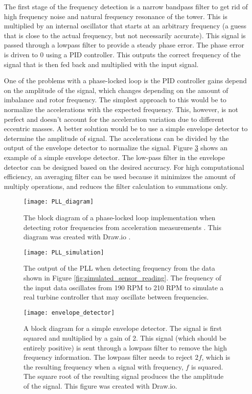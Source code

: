 The first stage of the frequency detection is a narrow bandpass filter to get rid of high frequency noise and natural frequency resonance of the tower.  This is multiplied by an internal oscillator that starts at an arbitrary frequency (a guess that is close to the actual frequency, but not necessarily accurate).  This signal is passed through a lowpass filter to provide a steady phase error.  The phase error is driven to 0 using a PID controller.  This outputs the correct frequency of the signal that is then fed back and multiplied with the input signal.

One of the problems with a phase-locked loop is the PID controller gains depend on the amplitude of the signal, which changes depending on the amount of imbalance and rotor frequency.  The simplest approach to this would be to normalize the accelerations with the expected frequency.  This, however, is not perfect and doesn't account for the acceleration variation due to different eccentric masses.  A better solution would be to use a simple envelope detector to determine the amplitude of signal.  The accelerations can be divided by the output of the envelope detector to normalize the signal.  Figure \ref{fig:envelope_detector} shows an example of a simple envelope detector\cite{envelope_detector_ref}.  The low-pass filter in the envelope detector can be designed based on the desired accuracy.  For high computational efficiency, an averaging filter can be used because it minimizes the amount of multiply operations, and reduces the filter calculation to summations only.

\begin{figure}
	\centering
	\texttt{[image: PLL\_diagram]}
	\decoRule
	\caption{The block diagram of a phase-locked loop implementation when detecting rotor frequencies from acceleration measurements \cite{embedded_zoom_fft}.  This diagram was created with Draw.io \cite{draw_io}.}
	\label{fig:PLL_diagram}
\end{figure}

\begin{figure}
	\centering
	\texttt{[image: PLL\_simulation]}
	\decoRule
	\caption{The output of the PLL  when detecting frequency from the data shown in Figure \ref{fig:simulated_sensor_reading}.  The frequency of the input data oscillates from 190 RPM to 210 RPM to simulate a real turbine controller that may oscillate between frequencies.}
	\label{fig:PLL_simulation}
\end{figure}

\begin{figure}
	\centering
	\texttt{[image: envelope\_detector]}
	\decoRule
	\caption{A block diagram for a simple envelope detector.  The signal is first squared and multiplied by a gain of 2.  This signal (which should be entirely positive) is sent through a lowpass filter to remove the high frequency information.  The lowpass filter needs to reject $2f$, which is the resulting frequency when a signal with frequency, $f$ is squared.  The square root of the resulting signal produces the the amplitude of the signal.  This figure was created with Draw.io.}
	\label{fig:envelope_detector}
\end{figure}

